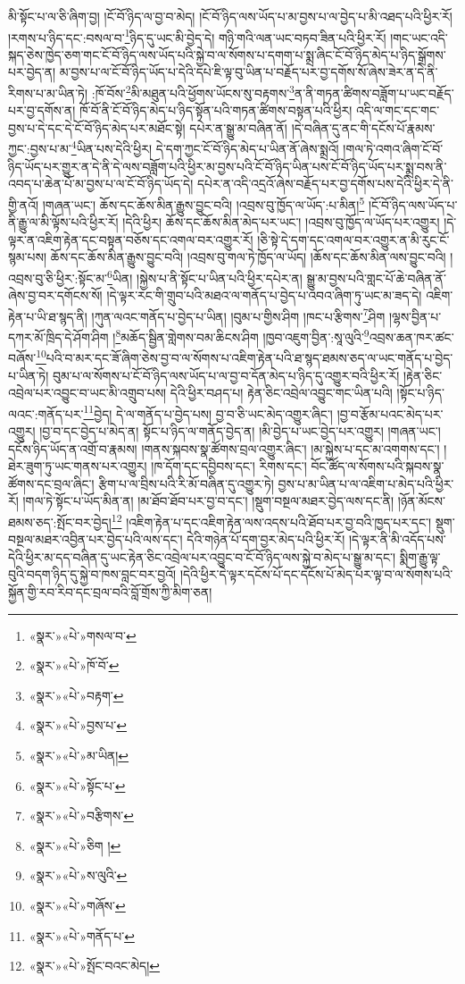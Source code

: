 མི་སྟོང་པ་ལ་ཅི་ཞིག་བྱ། །ངོ་བོ་ཉིད་ལ་བྱ་བ་མེད། །ངོ་བོ་ཉིད་ལས་ཡོད་པ་མ་བྱས་པ་ལ་བྱེད་པ་མི་འཐད་པའི་ཕྱིར་རོ། །རགས་པ་ཉིད་དང་:བསལ་བ་\footnote{«སྣར་»«པེ་»གསལ་བ་}ཉིད་དུ་ཡང་མི་བྱེད་དེ། གཉི་གའི་ལན་ཡང་བཏབ་ཟིན་པའི་ཕྱིར་རོ། །གང་ཡང་འདི་སྐད་ཅེས་ཁྱེད་ཅག་གང་ངོ་བོ་ཉིད་ལས་ཡོད་པའི་སྐྱེ་བ་ལ་སོགས་པ་དགག་པ་སྨྲ་ཞིང་ངོ་བོ་ཉིད་མེད་པ་ཉིད་སྒྲོགས་པར་བྱེད་ན། མ་བྱས་པ་ལ་ངོ་བོ་ཉིད་ཡོད་པ་དེའི་དཔེ་ཇི་ལྟ་བུ་ཡིན་པ་བརྗོད་པར་བྱ་དགོས་སོ་ཞེས་ཟེར་ན་དེ་ནི་རིགས་པ་མ་ཡིན་ཏེ། :ཁོ་བོས་\footnote{«སྣར་»«པེ་»ཁོ་བོ་}མི་མཐུན་པའི་ཕྱོགས་ཡོངས་སུ་བརྟགས་\footnote{«སྣར་»«པེ་»བརྟག་}ན་ནི་གཏན་ཚིགས་བཟློག་པ་ཡང་བརྗོད་པར་བྱ་དགོས་ན། ཁོ་བོ་ནི་ངོ་བོ་ཉིད་མེད་པ་ཉིད་སྟོན་པའི་གཏན་ཚིགས་བསྟན་པའི་ཕྱིར། འདི་ལ་གང་དང་གང་བྱས་པ་དེ་དང་དེ་ངོ་བོ་ཉིད་མེད་པར་མཐོང་སྟེ། དཔེར་ན་སྒྱུ་མ་བཞིན་ནོ། །དེ་བཞིན་དུ་ནང་གི་དངོས་པོ་རྣམས་ཀྱང་:བྱས་པ་མ་\footnote{«སྣར་»«པེ་»བྱས་པ་}ཡིན་པས་དེའི་ཕྱིར། དེ་དག་ཀྱང་ངོ་བོ་ཉིད་མེད་པ་ཡིན་ནོ་ཞེས་སྨྲའོ། །གལ་ཏེ་འགའ་ཞིག་ངོ་བོ་ཉིད་ཡོད་པར་གྱུར་ན་དེ་ནི་དེ་ལས་བཟློག་པའི་ཕྱིར་མ་བྱས་པའི་ངོ་བོ་ཉིད་ཡིན་པས་ངོ་བོ་ཉིད་ཡོད་པར་སྨྲ་བས་ནི་འབད་པ་ཆེན་པོ་མ་བྱས་པ་ལ་ངོ་བོ་ཉིད་ཡོད་དེ། དཔེར་ན་འདི་འདྲའོ་ཞེས་བརྗོད་པར་བྱ་དགོས་པས་དེའི་ཕྱིར་དེ་ནི་གྱི་ནའོ། །གཞན་ཡང་། ཆོས་དང་ཆོས་མིན་རྒྱུས་བྱུང་བའི། །འབྲས་བུ་ཁྱོད་ལ་ཡོད་:པ་མིན།\footnote{«སྣར་»«པེ་»མ་ཡིན།} །ངོ་བོ་ཉིད་ལས་ཡོད་པ་ནི་རྒྱུ་ལ་མི་ལྟོས་པའི་ཕྱིར་རོ། །དེའི་ཕྱིར། ཆོས་དང་ཆོས་མིན་མེད་པར་ཡང་། །འབྲས་བུ་ཁྱོད་ལ་ཡོད་པར་འགྱུར། །དེ་ལྟར་ན་འཇིག་རྟེན་དང་བསྟན་བཅོས་དང་འགལ་བར་འགྱུར་རོ། །ཅི་སྟེ་དེ་དག་དང་འགལ་བར་འགྱུར་ན་མི་རུང་ངོ་སྙམ་པས། ཆོས་དང་ཆོས་མིན་རྒྱུས་བྱུང་བའི། །འབྲས་བུ་གལ་ཏེ་ཁྱོད་ལ་ཡོད། །ཆོས་དང་ཆོས་མིན་ལས་བྱུང་བའི། །འབྲས་བུ་ཅི་ཕྱིར་:སྟོང་མ་\footnote{«སྣར་»«པེ་»སྟོང་པ་}ཡིན། །སྐྱེས་པ་ནི་སྟོང་པ་ཡིན་པའི་ཕྱིར་དཔེར་ན། སྒྱུ་མ་བྱས་པའི་གླང་པོ་ཆེ་བཞིན་ནོ་ཞེས་བྱ་བར་དགོངས་སོ། །དེ་ལྟར་རང་གི་གྲུབ་པའི་མཐའ་ལ་གནོད་པ་བྱེད་པ་འབའ་ཞིག་ཏུ་ཡང་མ་ཟད་དེ། འཇིག་རྟེན་པ་ཡི་ཐ་སྙད་ནི། །ཀུན་ལའང་གནོད་པ་བྱེད་པ་ཡིན། །བུམ་པ་གྱིས་ཤིག །ཁང་པ་རྩིགས་\footnote{«སྣར་»«པེ་»བརྩིགས་}ཤིག །ལྷས་བྱིན་པ་དཀར་མོ་ཁྲིད་དེ་ཤོག་ཤིག །\footnote{«སྣར་»«པེ་»ཅིག །}མཆོད་སྦྱིན་གླེགས་བམ་ཆིངས་ཤིག །ཁྱབ་འཇུག་བྱིན་:སཱ་ལུའི་\footnote{«སྣར་»«པེ་»ས་ལུའི་}འབྲས་ཆན་ཁར་ཚང་བཞོས་\footnote{«སྣར་»«པེ་»གཞོས་}པའི་བ་མར་དང་ཟོ་ཞིག་ཅེས་བྱ་བ་ལ་སོགས་པ་འཇིག་རྟེན་པའི་ཐ་སྙད་ཐམས་ཅད་ལ་ཡང་གནོད་པ་བྱེད་པ་ཡིན་ཏེ། བུམ་པ་ལ་སོགས་པ་ངོ་བོ་ཉིད་ལས་ཡོད་པ་ལ་བྱ་བ་དོན་མེད་པ་ཉིད་དུ་འགྱུར་བའི་ཕྱིར་རོ། །རྟེན་ཅིང་འབྲེལ་པར་འབྱུང་བ་ཡང་མི་འགྲུབ་པས། དེའི་ཕྱིར་བཤད་པ། རྟེན་ཅིང་འབྲེལ་འབྱུང་གང་ཡིན་པའི། །སྟོང་པ་ཉིད་ལའང་:གནོད་པར་\footnote{«སྣར་»«པེ་»གནོད་པ་}བྱེད། དེ་ལ་གནོད་པ་བྱེད་པས། བྱ་བ་ཅི་ཡང་མེད་འགྱུར་ཞིང་། །བྱ་བ་རྩོམ་པའང་མེད་པར་འགྱུར། །བྱ་བ་དང་བྱེད་པ་མེད་ན། སྟོང་པ་ཉིད་ལ་གནོད་བྱེད་ན། །མི་བྱེད་པ་ཡང་བྱེད་པར་འགྱུར། །གཞན་ཡང་། དངོས་ཉིད་ཡོད་ན་འགྲོ་བ་རྣམས། །གནས་སྐབས་སྣ་ཚོགས་བྲལ་འགྱུར་ཞིང་། །མ་སྐྱེས་པ་དང་མ་འགགས་དང་། །ཐེར་ཟུག་ཏུ་ཡང་གནས་པར་འགྱུར། །ཁ་དོག་དང་དབྱིབས་དང་། རིགས་དང་། བོང་ཚོད་ལ་སོགས་པའི་སྐབས་སྣ་ཚོགས་དང་བྲལ་ཞིང་། རྩིག་པ་ལ་བྲིས་པའི་རི་མོ་བཞིན་དུ་འགྱུར་ཏེ། བྱས་པ་མ་ཡིན་པ་ལ་འཇིག་པ་མེད་པའི་ཕྱིར་རོ། །གལ་ཏེ་སྟོང་པ་ཡོད་མིན་ན། །མ་ཐོབ་ཐོབ་པར་བྱ་བ་དང་། །སྡུག་བསྔལ་མཐར་བྱེད་ལས་དང་ནི། །ཉོན་མོངས་ཐམས་ཅད་:སྤོང་བར་བྱེད།\footnote{«སྣར་»«པེ་»སྤོང་བའང་མེད།} །འཇིག་རྟེན་པ་དང་འཇིག་རྟེན་ལས་འདས་པའི་ཐོབ་པར་བྱ་བའི་ཁྱད་པར་དང་། སྡུག་བསྔལ་མཐར་འབྱིན་པར་བྱེད་པའི་ལས་དང་། དེའི་གཉེན་པོ་དག་བྱར་མེད་པའི་ཕྱིར་རོ། །དེ་ལྟར་ནི་མི་འདོད་པས་དེའི་ཕྱིར་མ་དད་བཞིན་དུ་ཡང་རྟེན་ཅིང་འབྲེལ་པར་འབྱུང་བ་ངོ་བོ་ཉིད་ལས་སྐྱེ་བ་མེད་པ་སྒྱུ་མ་དང་། སྨིག་རྒྱུ་ལྟ་བུའི་བདག་ཉིད་དུ་སྐྱེ་བ་ཁས་བླང་བར་བྱའོ། །དེའི་ཕྱིར་དེ་ལྟར་དངོས་པོ་དང་དངོས་པོ་མེད་པར་ལྟ་བ་ལ་སོགས་པའི་སྐྱོན་གྱི་རབ་རིབ་དང་བྲལ་བའི་བློ་གྲོས་ཀྱི་མིག་ཅན། 